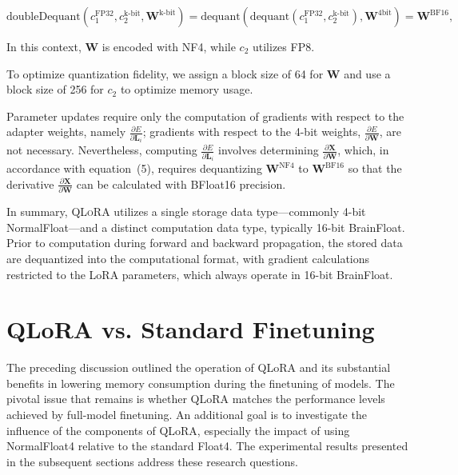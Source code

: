 \begin{equation}
    \text{doubleDequant}(c_1^{\text{FP32}}, c_2^{\text{k-bit}}, \mathbf{W}^{\text{k-bit}}) = \text{dequant}(\text{dequant}(c_1^{\text{FP32}}, c_2^{\text{k-bit}}), \mathbf{W}^{\text{4bit}}) = \mathbf{W}^{\text{BF16}},
\end{equation}

In this context, $\mathbf{W}$ is encoded with NF4, while $c_2$ utilizes FP8.

To optimize quantization fidelity, we assign a block size of 64 for $\mathbf{W}$ and use a block size of 256 for $c_2$ to optimize memory usage.

Parameter updates require only the computation of gradients with respect to the adapter weights, namely $\frac{\partial E}{\partial \mathbf{L}_i}$; gradients with respect to the 4-bit weights, $\frac{\partial E}{\partial \mathbf{W}}$, are not necessary. Nevertheless, computing $\frac{\partial E}{\partial \mathbf{L}_i}$ involves determining $\frac{\partial \mathbf{X}}{\partial \mathbf{W}}$, which, in accordance with equation~(5), requires dequantizing $\mathbf{W}^{\text{NF4}}$ to $\mathbf{W}^{\text{BF16}}$ so that the derivative $\frac{\partial \mathbf{X}}{\partial \mathbf{W}}$ can be calculated with BFloat16 precision.

In summary, \textsc{QLoRA} utilizes a single storage data type—commonly 4-bit NormalFloat—and a distinct computation data type, typically 16-bit BrainFloat. Prior to computation during forward and backward propagation, the stored data are dequantized into the computational format, with gradient calculations restricted to the LoRA parameters, which always operate in 16-bit BrainFloat.

\section{QLoRA vs. Standard Finetuning}
\label{sec:comp_to_std}

The preceding discussion outlined the operation of QLoRA and its substantial benefits in lowering memory consumption during the finetuning of models. The pivotal issue that remains is whether QLoRA matches the performance levels achieved by full-model finetuning. An additional goal is to investigate the influence of the components of QLoRA, especially the impact of using NormalFloat4 relative to the standard Float4. The experimental results presented in the subsequent sections address these research questions.

